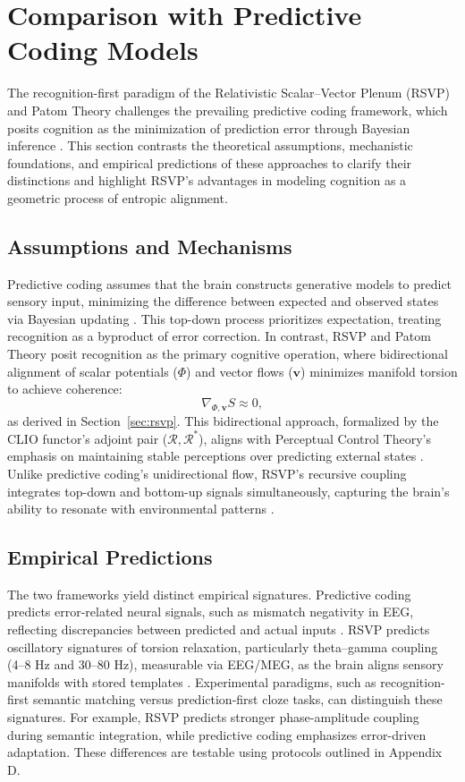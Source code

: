 \documentclass[11pt]{article}
\begin{document}
\section{Comparison with Predictive Coding Models}
\label{sec:predictive-coding}
The recognition-first paradigm of the Relativistic Scalar--Vector Plenum (RSVP) and Patom Theory challenges the prevailing predictive coding framework, which posits cognition as the minimization of prediction error through Bayesian inference \citep{friston2010free, clark2013whatever}. This section contrasts the theoretical assumptions, mechanistic foundations, and empirical predictions of these approaches to clarify their distinctions and highlight RSVP’s advantages in modeling cognition as a geometric process of entropic alignment.

\subsection{Assumptions and Mechanisms}
Predictive coding assumes that the brain constructs generative models to predict sensory input, minimizing the difference between expected and observed states via Bayesian updating \citep{friston2010free}. This top-down process prioritizes expectation, treating recognition as a byproduct of error correction. In contrast, RSVP and Patom Theory posit recognition as the primary cognitive operation, where bidirectional alignment of scalar potentials ($\Phi$) and vector flows ($\mathbf{v}$) minimizes manifold torsion to achieve coherence:
\[
\nabla_{\Phi,\mathbf{v}} S \approx 0,
\]
as derived in Section~\ref{sec:rsvp}. This bidirectional approach, formalized by the CLIO functor’s adjoint pair ($\mathcal{R}, \mathcal{R}^\ast$), aligns with Perceptual Control Theory’s emphasis on maintaining stable perceptions over predicting external states \citep{powers1973behavior}. Unlike predictive coding’s unidirectional flow, RSVP’s recursive coupling integrates top-down and bottom-up signals simultaneously, capturing the brain’s ability to resonate with environmental patterns \citep{gibson1979ecological}.

\subsection{Empirical Predictions}
The two frameworks yield distinct empirical signatures. Predictive coding predicts error-related neural signals, such as mismatch negativity in EEG, reflecting discrepancies between predicted and actual inputs \citep{clark2013whatever}. RSVP predicts oscillatory signatures of torsion relaxation, particularly theta--gamma coupling (4--8 Hz and 30--80 Hz), measurable via EEG/MEG, as the brain aligns sensory manifolds with stored templates \citep{alivisatos2012brain}. Experimental paradigms, such as recognition-first semantic matching versus prediction-first cloze tasks, can distinguish these signatures. For example, RSVP predicts stronger phase-amplitude coupling during semantic integration, while predictive coding emphasizes error-driven adaptation. These differences are testable using protocols outlined in Appendix D.
\end{document}
